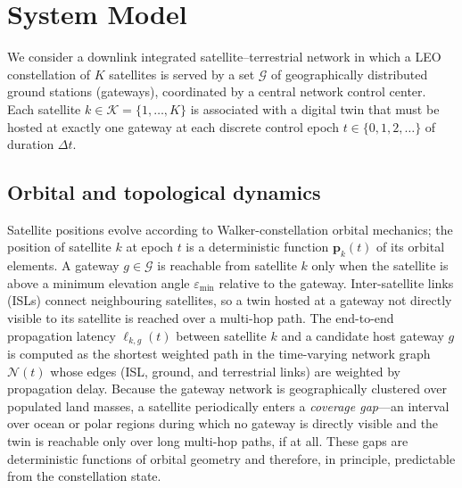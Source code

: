 \documentclass[11pt]{article}
\begin{document}
\section{System Model}
\label{sec:model}

We consider a downlink integrated satellite--terrestrial network in which a LEO
constellation of $K$ satellites is served by a set $\mathcal{G}$ of geographically
distributed ground stations (gateways), coordinated by a central network control
center. Each satellite $k \in \mathcal{K} = \{1,\dots,K\}$ is associated with a
digital twin that must be hosted at exactly one gateway at each discrete control
epoch $t \in \{0,1,2,\dots\}$ of duration $\Delta t$.

\subsection{Orbital and topological dynamics}
Satellite positions evolve according to Walker-constellation orbital mechanics;
the position of satellite $k$ at epoch $t$ is a deterministic function
$\bm{p}_k(t)$ of its orbital elements. A gateway $g \in \mathcal{G}$ is reachable
from satellite $k$ only when the satellite is above a minimum elevation angle
$\varepsilon_{\min}$ relative to the gateway. Inter-satellite links (ISLs) connect
neighbouring satellites, so a twin hosted at a gateway not directly visible to its
satellite is reached over a multi-hop path. The end-to-end propagation latency
$\ell_{k,g}(t)$ between satellite $k$ and a candidate host gateway $g$ is computed
as the shortest weighted path in the time-varying network graph
$\mathcal{N}(t)$ whose edges (ISL, ground, and terrestrial links) are weighted by
propagation delay. Because the gateway network is geographically clustered over
populated land masses, a satellite periodically enters a \emph{coverage gap}---an
interval over ocean or polar regions during which no gateway is directly visible
and the twin is reachable only over long multi-hop paths, if at all. These gaps
are deterministic functions of orbital geometry and therefore, in principle,
predictable from the constellation state.
\end{document}
